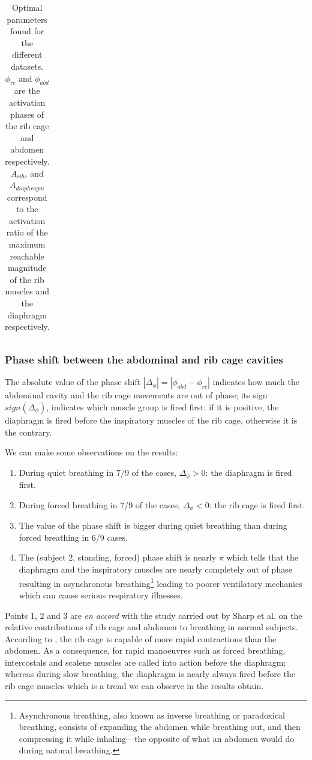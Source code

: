 \begin{table}
\begin{center}
\begin{tabular}{|c|c|c|c|c|c|c|}
\hline
\end{tabular}
\end{center}
\caption[Optimal parameters found for the different datasets]{\label{tab:optim_param}Optimal parameters found for the different datasets. $\phi_{rc}$ and $\phi_{abd}$ are the activation phases of the rib cage and abdomen respectively. $A_{ribs}$ and $A_{diaphragm}$ correspond to the activation ratio of the maximum reachable magnitude of the rib muscles and the diaphragm respectively.
}
\end{table}

\subsubsection{Phase shift between the abdominal and rib cage cavities}
The absolute value of the phase shift $|\Delta_{\phi}| = |\phi_{abd} - \phi_{rc}|$ indicates how much the abdominal cavity and the rib cage movements are out of phase; its sign $sign(\Delta_{\phi})$, indicates which muscle group is fired first: if it is positive, the diaphragm is fired before the inspiratory muscles of the rib cage, otherwise it is the contrary.

We can make some observations on the results:
\begin{enumerate}
	\item During quiet breathing in 7/9 of the cases, $\Delta_{\phi} > 0$: the diaphragm is fired first. 
	\item During forced breathing in 7/9 of the cases, $\Delta_{\phi} < 0$: the rib cage is fired first.
	\item The value of the phase shift is bigger during quiet breathing than during forced breathing in 6/9 cases.
	\item The (subject 2, standing, forced) phase shift is nearly $\pi$ which tells that the diaphragm and the inspiratory muscles are nearly completely out of phase resulting in asynchronous breathing\footnote{Asynchronous breathing, also known as inverse breathing or paradoxical breathing, consists of expanding the abdomen while breathing out, and then compressing it while inhaling---the opposite of what an abdomen would do during natural breathing.} leading to poorer ventilatory mechanics which can cause serious respiratory illnesses.
\end{enumerate}

Points 1, 2 and 3 are \emph{en accord} with the study carried out by Sharp et al. \cite{sharp1975relative} on the relative contributions of rib cage and abdomen to breathing in normal subjects. According to \cite{sharp1975relative}, the rib cage is capable of more rapid contractions than the abdomen. As a consequence, for rapid manoeuvres such as forced breathing, intercostals and scalene muscles are called into action before the diaphragm; whereas during slow breathing, the diaphragm is nearly always fired before the rib cage muscles which is a trend we can observe in the results obtain.

